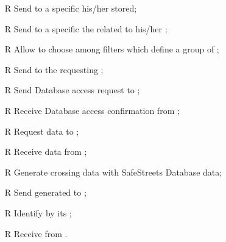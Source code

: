 \documentclass[../../../RASD.tex]{subfiles}
\begin{document}
\begin{itemize}
	\item[R\subs{21}]Send to a specific  his/her  stored;
	\item[R\subs{22}]Send to a specific  the  related to his/her ;
	\item[R\subs{23}]Allow  to choose among filters which define a group of ;
	\item[R\subs{24}]Send  to the requesting ;
	\item[R\subs{25}]Send  Database access request to ; 
	\item[R\subs{26}]Receive  Database access confirmation from ;
	\item[R\subs{27}]Request  data to ;
	\item[R\subs{28}]Receive  data from ;
	\item[R\subs{29}]Generate  crossing   data with SafeStreets Database data;
	\item[R\subs{30}]Send generated  to ;
	\item[R\subs{31}]Identify  by its ;
	\item[R\subs{32}]Receive  from .

	
\end{itemize}
\end{document}
